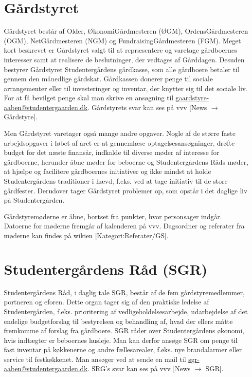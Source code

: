 \documentclass[11pt,article,twoside,openany,danish,extrafontsizes]{memoir} %
\begin{document}
\section{Gårdstyret}
Gårdstyret består af Older, ØkonomiGårdmesteren (ØGM), OrdensGårdmesteren (OGM), NetGårdmesteren (NGM) og FundraisingGårdmesteren (FGM). Meget kort beskrevet er Gårdstyret valgt til at repræsentere og varetage gårdboernes interesser samt at realisere de beslutninger, der vedtages af Gårddagen. Desuden bestyrer Gårdstyret Studentergårdens gårdkasse, som alle gårdboere betaler til gennem den månedlige gårdskat. Gårdkassen donerer penge til sociale arrangementer eller til investeringer og inventar, der knytter sig til det sociale liv. For at få bevilget penge skal man skrive en ansøgning til \url{gaardstyre-aaben@studentergaarden.dk}. Gårdstyrets svar kan ses på vvv [News $\rightarrow$ Gårdstyre].

Men Gårdstyret varetager også mange andre opgaver. Nogle af de større faste arbejdsopgaver i løbet af året er at gennemlæse optagelsesansøgninger, drøfte budget for det næste finansår, indkalde til diverse møder af interesse for gårdboerne, herunder åbne møder for beboerne og Studentergårdens Råds møder, at hjælpe og facilitere gårdboernes initiativer og ikke mindst at holde Studentergårdens traditioner i hævd, f.eks. ved at tage initiativ til de store gårdfester. Derudover tager Gårdstyret problemer op, som opstår i det daglige liv på Studentergården.

Gårdstyremøderne er åbne, bortset fra punkter, hvor personsager indgår. Datoerne for møderne fremgår af kalenderen på vvv. Dagsordner og referater fra møderne kan findes på wikien [Kategori:Referater/GS].


\section{Studentergårdens Råd (SGR)}
Studentergårdens Råd, i daglig tale SGR, består af de fem gårdstyremedlemmer, portneren og eforen. Dette organ tager sig af den praktiske ledelse af Studentergården, f.eks. prioritering af vedligeholdelsesarbejde, udarbejdelse af det endelige budgetforslag til bestyrelsen og behandling af, hvad der ellers måtte fremkomme af forslag fra gårdboere. SGR råder over Studentergårdens økonomi, hvis indtægter er beboernes husleje. Man kan derfor ansøge SGR om penge til fast inventar på køkkenerne og andre fællesarealer, f.eks. nye brandalarmer eller service til festkøkkenet. Man ansøger ved at sende en mail til \url{sgr-aaben@studentergaarden.dk}. SRG's svar kan ses på vvv [News $\rightarrow$ SGR].
\end{document}
